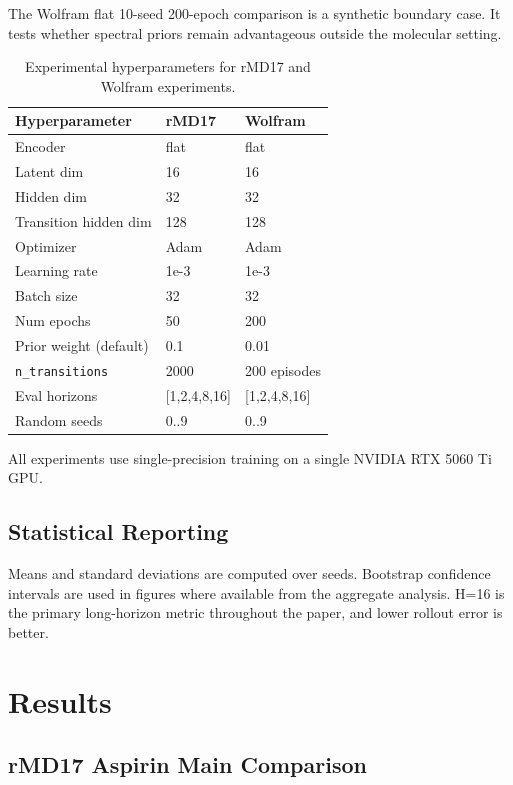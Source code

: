 \documentclass[pdflatex,sn-mathphys-num]{sn-jnl}
\begin{document}
The Wolfram flat 10-seed 200-epoch comparison is a synthetic boundary case. It tests whether spectral priors remain advantageous outside the molecular setting.

\begin{table}[t]
\centering
\caption{Experimental hyperparameters for rMD17 and Wolfram experiments.}
\label{tab:hyperparameters}
\begin{tabular}{lll}
\toprule
Hyperparameter & rMD17 & Wolfram \\
\midrule
Encoder & flat & flat \\
Latent dim & 16 & 16 \\
Hidden dim & 32 & 32 \\
Transition hidden dim & 128 & 128 \\
Optimizer & Adam & Adam \\
Learning rate & 1e-3 & 1e-3 \\
Batch size & 32 & 32 \\
Num epochs & 50 & 200 \\
Prior weight (default) & 0.1 & 0.01 \\
\texttt{n\_transitions} & 2000 & 200 episodes \\
Eval horizons & [1,2,4,8,16] & [1,2,4,8,16] \\
Random seeds & 0..9 & 0..9 \\
\bottomrule
\end{tabular}
\end{table}

All experiments use single-precision training on a single NVIDIA RTX 5060 Ti GPU.

\subsection{Statistical Reporting}

Means and standard deviations are computed over seeds. Bootstrap confidence intervals are used in figures where available from the aggregate analysis. H=16 is the primary long-horizon metric throughout the paper, and lower rollout error is better.

\section{Results}

\subsection{rMD17 Aspirin Main Comparison}
\end{document}
